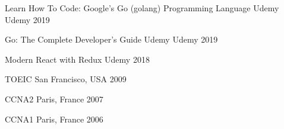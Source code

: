 \begin{cvcertifications}

    \cvcertification
    {Learn How To Code: Google's Go (golang) Programming Language Udemy} %
    {Udemy} %
    {2019} %

    \cvcertification
    {Go: The Complete Developer's Guide Udemy} %
    {Udemy} %
    {2019} %

    \cvcertification
    {Modern React with Redux} %
    {Udemy} %
    {2018} %

    \cvcertification
    {TOEIC} %
    {San Francisco, USA} %
    {2009} %

    \cvcertification
    {CCNA2} %
    {Paris, France} %
    {2007} %

    \cvcertification
    {CCNA1} %
    {Paris, France} %
    {2006} %

\end{cvcertifications}
